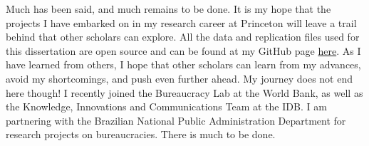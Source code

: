 Much has been said, and much remains to be done. It is my hope that the projects I have embarked on in my research career at Princeton will leave a trail behind that other scholars can explore. All the data and replication files used for this dissertation are open source and can be found at my GitHub page \href{https://github.com/galileukim}{here}. As I have learned from others, I hope that other scholars can learn from my advances, avoid my shortcomings, and push even further ahead. My journey does not end here though! I recently joined the Bureaucracy Lab at the World Bank, as well as the Knowledge, Innovations and Communications Team at the IDB. I am partnering with the Brazilian National Public Administration Department for research projects on bureaucracies. There is much to be done.

\newpage
